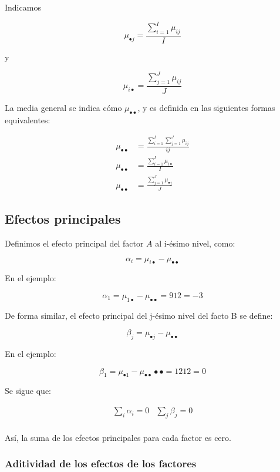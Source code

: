 \documentclass[]{book}
\theoremstyle{definition}
\theoremstyle{definition}
\theoremstyle{definition}
\theoremstyle{remark}
\begin{document}
Indicamos

\[
\mu_{\bullet j} = \frac{\sum_{i = 1}^{I}\mu_{ij}}{I}
\]

y

\[
\mu_{i \bullet} = \frac{\sum_{j = 1}^{J}\mu_{ij}}{J}
\]

La media general se indica cómo \(\mu_{\bullet \bullet}\), y es definida
en las siguientes formas equivalentes:

\[
\begin{aligned}
\mu_{\bullet \bullet} &= \frac{\sum_{i = 1}^{I}{\sum_{j = 1}^{J}\mu_{ij}}}{ij}\\
\mu_{\bullet \bullet} &= \frac{\sum_{i = 1}^{I}\mu_{i \bullet}}{I}\\
\mu_{\bullet \bullet} &= \frac{\sum_{j = 1}^{J}\mu_{\bullet j}}{J}
\end{aligned}
\]

\hypertarget{efectos-principales}{%
\subsection{Efectos principales}\label{efectos-principales}}

Definimos el efecto principal del factor \(A\) al i-ésimo nivel, como:

\[
\alpha_{i} = \mu_{i \bullet} - \mu_{\bullet \bullet}
\]

En el ejemplo:

\[
\alpha_{1} = \mu_{1 \bullet} - \mu_{\bullet \bullet} = 912 = - 3
\]

De forma similar, el efecto principal del j-ésimo nivel del facto B se
define:

\[
\beta_{j} = \mu_{\bullet j} - \mu_{\bullet \bullet}
\]

En el ejemplo:

\[
\beta_{1} = \mu_{\bullet 1} - \mu_{\bullet \bullet}\bullet \bullet = 1212 = 0
\]

Se sigue que:

\[
\begin{matrix}
\sum_{i}^{}\alpha_{i} = 0 & \sum_{j}^{}\beta_{j} = 0 \\
\end{matrix}
\]

Así, la suma de los efectos principales para cada factor es cero.

\hypertarget{aditividad-de-los-efectos-de-los-factores}{%
\subsubsection{Aditividad de los efectos de los
factores}\label{aditividad-de-los-efectos-de-los-factores}}
\end{document}
